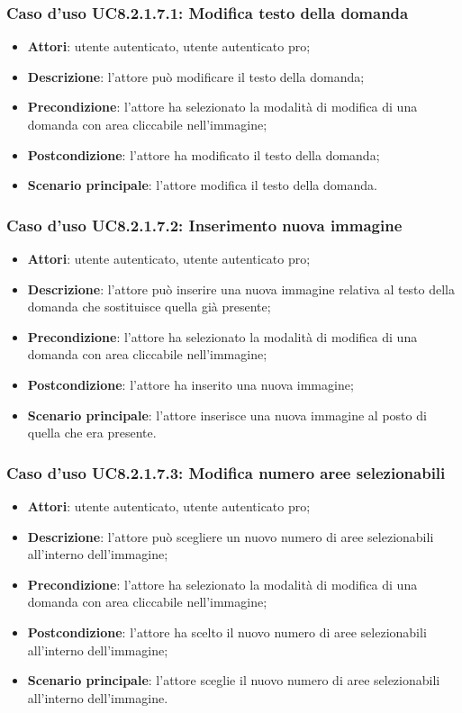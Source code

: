 \subsubsection{Caso d'uso UC8.2.1.7.1: Modifica testo della domanda}
\begin{itemize}
	\item \textbf{Attori}: utente autenticato, utente autenticato pro;
	\item \textbf{Descrizione}: l'attore può modificare il testo della domanda;
	\item \textbf{Precondizione}: l'attore ha selezionato la modalità di modifica di una domanda con area cliccabile nell'immagine; 
	\item \textbf{Postcondizione}: l'attore ha modificato il testo della domanda;
	\item \textbf{Scenario principale}: l'attore modifica il testo della domanda. 
\end{itemize}

\subsubsection{Caso d'uso UC8.2.1.7.2: Inserimento nuova immagine}
\begin{itemize}
	\item \textbf{Attori}: utente autenticato, utente autenticato pro;
	\item \textbf{Descrizione}: l'attore può inserire una nuova immagine relativa al testo della domanda che sostituisce quella già presente;
	\item \textbf{Precondizione}: l'attore ha selezionato la modalità di modifica di una domanda con area cliccabile nell'immagine;  
	\item \textbf{Postcondizione}: l'attore ha inserito una nuova immagine;
	\item \textbf{Scenario principale}: l'attore inserisce una nuova immagine al posto di quella che era presente. 	
\end{itemize}

\subsubsection{Caso d'uso UC8.2.1.7.3: Modifica numero aree selezionabili}
\begin{itemize}
	\item \textbf{Attori}: utente autenticato, utente autenticato pro;
	\item \textbf{Descrizione}: l'attore può scegliere un nuovo numero di aree selezionabili all'interno dell'immagine;
	\item \textbf{Precondizione}: l'attore ha selezionato la modalità di modifica di una domanda con area cliccabile nell'immagine; 
	\item \textbf{Postcondizione}: l'attore ha scelto il nuovo numero di aree selezionabili all'interno dell'immagine;
	\item \textbf{Scenario principale}: l'attore sceglie il nuovo numero di aree selezionabili all'interno dell'immagine. 	
\end{itemize}


